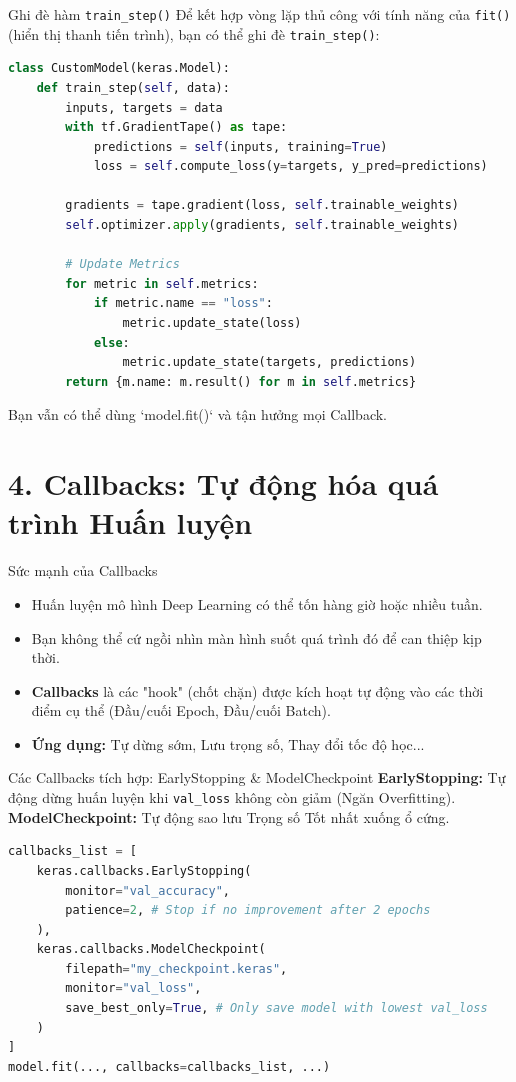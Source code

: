 \documentclass[aspectratio=169]{beamer}
\begin{document}
\begin{frame}[fragile]{Ghi đè hàm \texttt{train\_step()}}
Để kết hợp vòng lặp thủ công với tính năng của \texttt{fit()} (hiển thị thanh tiến trình), bạn có thể ghi đè \texttt{train\_step()}:
\begin{lstlisting}[language=Python, basicstyle=\ttfamily\scriptsize]
class CustomModel(keras.Model):
    def train_step(self, data):
        inputs, targets = data
        with tf.GradientTape() as tape:
            predictions = self(inputs, training=True)
            loss = self.compute_loss(y=targets, y_pred=predictions)

        gradients = tape.gradient(loss, self.trainable_weights)
        self.optimizer.apply(gradients, self.trainable_weights)

        # Update Metrics
        for metric in self.metrics:
            if metric.name == "loss":
                metric.update_state(loss)
            else:
                metric.update_state(targets, predictions)
        return {m.name: m.result() for m in self.metrics}
\end{lstlisting}
Bạn vẫn có thể dùng `model.fit()` và tận hưởng mọi Callback.
\end{frame}

\section{4. Callbacks: Tự động hóa quá trình Huấn luyện}

\begin{frame}{Sức mạnh của Callbacks}
    \begin{itemize}
        \item Huấn luyện mô hình Deep Learning có thể tốn hàng giờ hoặc nhiều tuần.
        \item Bạn không thể cứ ngồi nhìn màn hình suốt quá trình đó để can thiệp kịp thời.
        \item \textbf{Callbacks} là các "hook" (chốt chặn) được kích hoạt tự động vào các thời điểm cụ thể (Đầu/cuối Epoch, Đầu/cuối Batch).
        \item \textbf{Ứng dụng:} Tự dừng sớm, Lưu trọng số, Thay đổi tốc độ học...
    \end{itemize}
\end{frame}

\begin{frame}[fragile]{Các Callbacks tích hợp: EarlyStopping \& ModelCheckpoint}
\textbf{EarlyStopping:} Tự động dừng huấn luyện khi \texttt{val\_loss} không còn giảm (Ngăn Overfitting).
\textbf{ModelCheckpoint:} Tự động sao lưu Trọng số Tốt nhất xuống ổ cứng.

\begin{lstlisting}[language=Python, basicstyle=\ttfamily\scriptsize]
callbacks_list = [
    keras.callbacks.EarlyStopping(
        monitor="val_accuracy", 
        patience=2, # Stop if no improvement after 2 epochs
    ),
    keras.callbacks.ModelCheckpoint(
        filepath="my_checkpoint.keras",
        monitor="val_loss",
        save_best_only=True, # Only save model with lowest val_loss
    )
]
model.fit(..., callbacks=callbacks_list, ...)
\end{lstlisting}
\end{frame}
\end{document}
